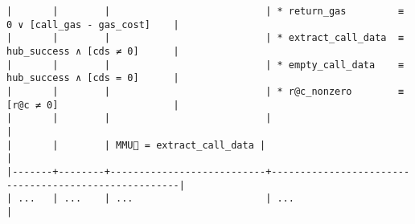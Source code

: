 \documentclass[varwidth=\maxdimen,margin=0.5cm,multi={verbatim}]{standalone}
\begin{document}
\begin{verbatim}
|       |        |                           | * return_gas         ≡  0 ∨ [call_gas - gas_cost]    |
|       |        |                           | * extract_call_data  ≡  hub_success ∧ [cds ≠ 0]      |
|       |        |                           | * empty_call_data    ≡  hub_success ∧ [cds = 0]      |
|       |        |                           | * r@c_nonzero        ≡  [r@c ≠ 0]                    |
|       |        |                           |                                                      |
|       |        | MMU🏴 = extract_call_data |                                                      |
|-------+--------+---------------------------+------------------------------------------------------|
| ...   | ...    | ...                       | ...                                                  |
\end{verbatim}
\end{document}
